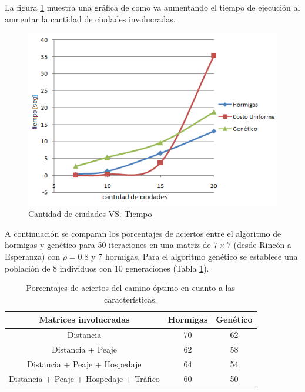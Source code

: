 \documentclass[conference,a4paper,10pt,oneside,final]{tfmpd}
\begin{document}
La figura \ref{fig:cvst} muestra una gráfica de como va aumentando el tiempo de ejecución al aumentar la cantidad de ciudades involucradas.

\begin{figure}[!h]
\includegraphics[width=\linewidth]{grafico.png}
\caption{Cantidad de ciudades VS. Tiempo}
\label{fig:cvst}
\end{figure}

A continuación se comparan los porcentajes de aciertos entre el algoritmo de hormigas y genético para 50 iteraciones en una matriz de $7\times7$ (desde Rincón a Esperanza) con $\rho=0.8$ y 7 hormigas. Para el algoritmo genético se establece una población de 8 individuos con 10 generaciones (Tabla \ref{table:tab2}).

\begin{table}[!h]
\begin{center}
\begin{tabular}[c]{ccc} \toprule
Matrices involucradas & Hormigas & Genético\\ \midrule
Distancia       						& 70 & 62 \\
Distancia + Peaje     					& 62 & 58 \\
Distancia + Peaje + Hospedaje   		& 64 & 54 \\
Distancia + Peaje + Hospedaje + Tráfico & 60 & 50 \\ \bottomrule    
\end{tabular}
\end{center}
\caption{Porcentajes de aciertos del camino óptimo en cuanto a las características.}
\label{table:tab2}
\end{table}
\end{document}
